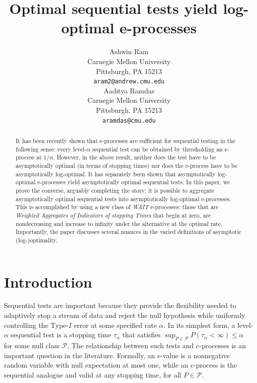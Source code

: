 \documentclass{article}
\title{Optimal sequential tests yield log-optimal e-processes}
\author{%
  Ashwin Ram\\
  Carnegie Mellon University\\
  Pittsburgh, PA 15213 \\
  \texttt{aram2@andrew.cmu.edu} \\
   \And
   Aaditya Ramdas\\
   Carnegie Mellon University \\
   Pittsburgh, PA 15213 \\
   \texttt{aramdas@cmu.edu} \\
}
\newcommand{\PP}{\mathcal P}
\theoremstyle{definition}
\begin{document}
\maketitle

\begin{abstract}
    It has been recently shown that e-processes are sufficient for sequential testing in the following sense: every level-$\alpha$ sequential test can be obtained by thresholding an e-process at $1/\alpha$. However, in the above result, neither does the test have to be asymptotically optimal (in terms of stopping times) nor does the e-process have to be  asymptotically log-optimal. It has separately been shown that asymptotically log-optimal e-processes yield asymptotically optimal sequential tests. In this paper, we prove the converse, arguably completing the story: it is possible to aggregate asymptotically optimal sequential tests into asymptotically log-optimal e-processes. This is accomplished by using a new class of \emph{WAIT} e-processes: those that are \emph{Weighted Aggregates of Indicators of stopping Times} that begin at zero, are nondecreasing and increase to infinity under the alternative at the optimal rate.
    Importantly, the paper discusses several nuances in the varied definitions of asymptotic (log-)optimality. 
\end{abstract}


\section{Introduction}
Sequential tests are important because they provide the flexibility needed to adaptively stop a stream of data and reject the null hypothesis while uniformly controlling the Type-$I$ error at some specified rate $\alpha$. In its simplest form, a level-$\alpha$ sequential test is a stopping time $\tau_\alpha$ that satisfies $\sup_{P\in\PP}P(\tau_{\alpha}<\infty)\le \alpha$ for some null class $\PP$. The relationship between such tests and $e$-processes is an important question in the literature. Formally, an $e$-value is a nonnegative random variable with null expectation at most one, while an $e$-process is the sequential analogue and valid at any stopping time, for all $P\in\PP$. 
\end{document}
